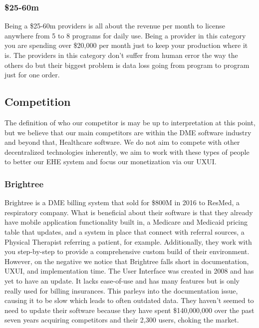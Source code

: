 \documentclass[letterpaper]{article}
\begin{document}
  \subsubsection{\$25-60m}
  Being a \$25-60m providers is all about the revenue per month to license anywhere from 5 to 8 programs for daily use. Being a provider in this category you are spending over \$20,000 per month just to keep your production where it is. The providers in this category don’t suffer from human error the way the others do but their biggest problem is data loss going from program to program just for one order.
%
\subsection{Competition}
The definition of who our competitor is may be up to interpretation at this point, but we believe that our main competitors are within the DME software industry and beyond that, Healthcare software. We do not aim to compete with other decentralized technologies inherently, we aim to work with these types of people to better our EHE system and focus our monetization via our UXUI.
%
  \subsubsection{Brightree}
  Brightree is a DME billing system that sold for \$800M in 2016 to ResMed, a respiratory company. What is beneficial about their software is that they already have mobile application functionality built in, a Medicare and Medicaid pricing table that updates, and a system in place that connect with referral sources, a Physical Therapist referring a patient, for example. Additionally, they work with you step-by-step to provide a comprehensive custom build of their environment.
%
  However, on the negative we notice that Brightree falls short in documentation, UXUI, and implementation time. The User Interface was created in 2008 and has yet to have an update. It lacks ease-of-use and has many features but is only really used for billing insurances. This parleys into the documentation issue, causing it to be slow which leads to often outdated data. They haven’t seemed to need to update their software because they have spent \$140,000,000 over the past seven years acquiring competitors and their 2,300 users, choking the market.
%
\end{document}
